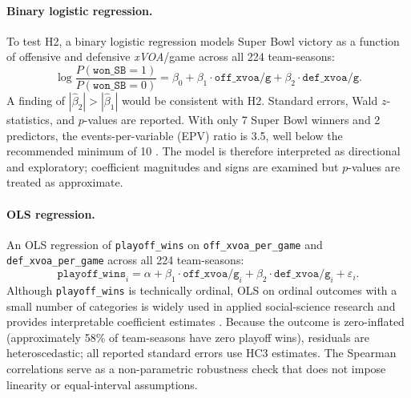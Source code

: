 \documentclass[12pt,a4paper]{article}
\newcommand{\xvoa}{\textit{xVOA}}
\begin{document}
\paragraph{Binary logistic regression.} To test H2, a binary logistic regression models Super Bowl victory as a function of offensive and defensive \xvoa{}/game across all 224 team-seasons:
\begin{equation}
  \label{eq:logistic}
  \log \frac{P(\texttt{won\_SB} = 1)}{P(\texttt{won\_SB} = 0)}
  = \beta_0
    + \beta_1 \cdot \texttt{off\_xvoa/g}
    + \beta_2 \cdot \texttt{def\_xvoa/g}.
\end{equation}
A finding of $|\hat{\beta}_2| > |\hat{\beta}_1|$ would be consistent with H2. Standard errors, Wald $z$-statistics, and $p$-values are reported. With only 7 Super Bowl winners and 2 predictors, the events-per-variable (EPV) ratio is 3.5, well below the recommended minimum of 10 \citep{hosmer2013logistic, peduzzi1996simulation}. The model is therefore interpreted as directional and exploratory; coefficient magnitudes and signs are examined but $p$-values are treated as approximate.

\paragraph{OLS regression.} An OLS regression of \texttt{playoff\_wins} on \texttt{off\_xvoa\_per\_game} and \texttt{def\_xvoa\_per\_game} across all 224 team-seasons:
\begin{equation}
  \label{eq:ols}
  \texttt{playoff\_wins}_i
  = \alpha
    + \beta_1 \cdot \texttt{off\_xvoa/g}_i
    + \beta_2 \cdot \texttt{def\_xvoa/g}_i
    + \varepsilon_i.
\end{equation}
Although \texttt{playoff\_wins} is technically ordinal, OLS on ordinal outcomes with a small number of categories is widely used in applied social-science research and provides interpretable coefficient estimates \citep{long1997regression}. Because the outcome is zero-inflated (approximately 58\% of team-seasons have zero playoff wins), residuals are heteroscedastic; all reported standard errors use HC3 estimates. The Spearman correlations serve as a non-parametric robustness check that does not impose linearity or equal-interval assumptions.
\end{document}
